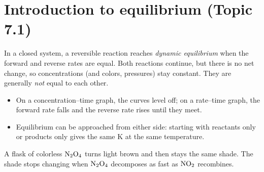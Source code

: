 \documentclass[11pt]{article}
\begin{document}
\titleblock
\begin{abstract}
This guide covers all of Unit 7, Equilibrium, in thirteen sections: one for each of Topics 7.1--7.12 in course order (the Fall 2024 course framework, in which pH and solubility moved to Unit 8 and the free energy of dissolution to Unit 9), plus a final section on lab skills and free-response technique. Each section gives the definitions, equations and particle-level reasoning the topic needs, at least one worked example, the phrasing that earns free-response points and the mistakes that cost them. The worked examples use their own numbers, so none of them give away an item in \emph{Unit 7 Practice Set A} or \emph{Unit 7 Practice Set B}. Plan on about 80 minutes for a full read with a calculator out.
\end{abstract}

\section{Introduction to equilibrium (Topic 7.1)}\label{t:7.1}
In a closed system, a reversible reaction reaches \emph{dynamic equilibrium} when the forward and reverse rates are equal. Both reactions continue, but there is no net change, so concentrations (and colors, pressures) stay constant. They are generally \emph{not} equal to each other.
\begin{itemize}
\item On a concentration--time graph, the curves level off; on a rate--time graph, the forward rate falls and the reverse rate rises until they meet.
\item Equilibrium can be approached from either side: starting with reactants only or products only gives the same K at the same temperature.
\end{itemize}
 A flask of colorless $\ce{N2O4}$ turns light brown and then stays the same shade. The shade stops changing when $\ce{N2O4}$ decomposes as fast as $\ce{NO2}$ recombines.
\end{document}
